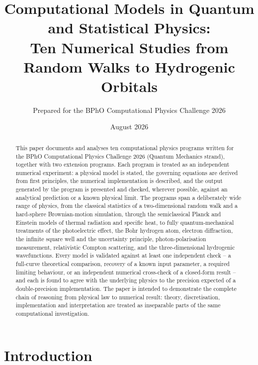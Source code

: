 \documentclass[11pt]{article}
\title{\Large Computational Models in Quantum and Statistical Physics: \\
Ten Numerical Studies from Random Walks to Hydrogenic Orbitals}
\author{Prepared for the BPhO Computational Physics Challenge 2026}
\date{August 2026}
\begin{document}
\maketitle

\begin{abstract}
This paper documents and analyses ten computational physics programs written for the BPhO Computational Physics Challenge 2026 (Quantum Mechanics strand), together with two extension programs. Each program is treated as an independent numerical experiment: a physical model is stated, the governing equations are derived from first principles, the numerical implementation is described, and the output generated by the program is presented and checked, wherever possible, against an analytical prediction or a known physical limit. The programs span a deliberately wide range of physics, from the classical statistics of a two-dimensional random walk and a hard-sphere Brownian-motion simulation, through the semiclassical Planck and Einstein models of thermal radiation and specific heat, to fully quantum-mechanical treatments of the photoelectric effect, the Bohr hydrogen atom, electron diffraction, the infinite square well and the uncertainty principle, photon-polarisation measurement, relativistic Compton scattering, and the three-dimensional hydrogenic wavefunctions. Every model is validated against at least one independent check -- a full-curve theoretical comparison, recovery of a known input parameter, a required limiting behaviour, or an independent numerical cross-check of a closed-form result -- and each is found to agree with the underlying physics to the precision expected of a double-precision implementation. The paper is intended to demonstrate the complete chain of reasoning from physical law to numerical result: theory, discretisation, implementation and interpretation are treated as inseparable parts of the same computational investigation.
\end{abstract}

\tableofcontents

\section{Introduction}
\end{document}
